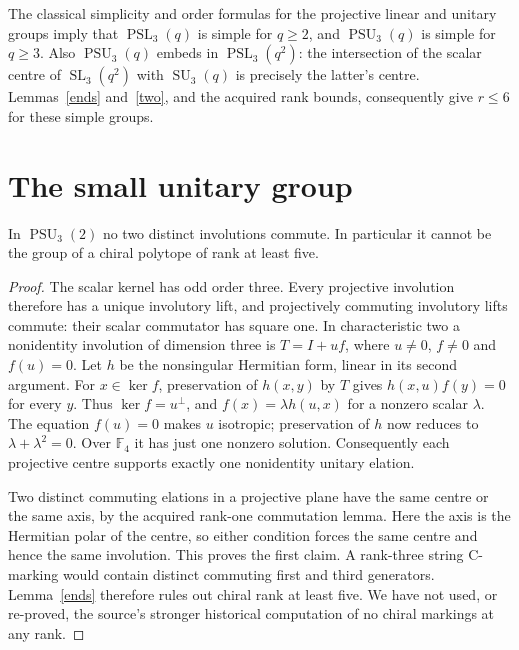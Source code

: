 \documentclass[11pt]{article}
\newcommand{\F}{\mathbb F}\newcommand{\gen}[1]{\langle#1\rangle}
\newcommand{\PSL}{\operatorname{PSL}}\newcommand{\PSU}{\operatorname{PSU}}
\begin{document}
The classical simplicity and order formulas for the projective linear
and unitary groups imply that $\PSL_3(q)$ is simple for $q\ge2$,
and $\PSU_3(q)$ is simple for $q\ge3$. Also $\PSU_3(q)$ embeds
in $\PSL_3(q^2)$: the intersection of the scalar centre of
$\operatorname{SL}_3(q^2)$ with $\operatorname{SU}_3(q)$ is precisely
the latter's centre. Lemmas~\ref{ends} and~\ref{two}, and the acquired
rank bounds, consequently give $r\le6$ for these simple groups.

\section*{The small unitary group}
\begin{lemma}\label{small}
In $\PSU_3(2)$ no two distinct involutions commute. In particular it
cannot be the group of a chiral polytope of rank at least five.
\end{lemma}
\begin{proof}
The scalar kernel has odd order three. Every projective involution
therefore has a unique involutory lift, and projectively commuting
involutory lifts commute: their scalar commutator has square one.
In characteristic two a nonidentity involution of dimension three is
$T=I+uf$, where $u\ne0$, $f\ne0$ and $f(u)=0$.
Let $h$ be the nonsingular Hermitian form, linear in its second argument.
For $x\in\ker f$, preservation of $h(x,y)$ by $T$ gives
$h(x,u)f(y)=0$ for every $y$. Thus $\ker f=u^\perp$, and
$f(x)=\lambda h(u,x)$ for a nonzero scalar $\lambda$.
The equation $f(u)=0$ makes $u$ isotropic; preservation of $h$ now
reduces to $\lambda+\lambda^2=0$. Over $\F_4$ it has just one
nonzero solution. Consequently each projective centre supports exactly
one nonidentity unitary elation.

Two distinct commuting elations in a projective plane have the same
centre or the same axis, by the acquired rank-one commutation lemma.
Here the axis is the Hermitian polar of the centre, so either condition
forces the same centre and hence the same involution. This proves the
first claim. A rank-three string C-marking would contain distinct
commuting first and third generators. Lemma~\ref{ends} therefore rules
out chiral rank at least five. We have not used, or re-proved, the source's
stronger historical computation of no chiral markings at any rank.
\end{proof}
\end{document}
